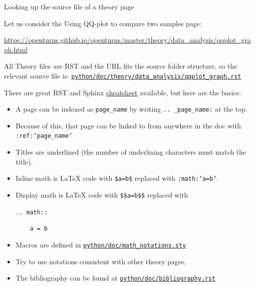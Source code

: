 \documentclass[8pt]{beamer}
\begin{document}
\begin{frame}{Looking up the source file of a theory page}


Let us consider the \alert{Using QQ-plot to compare two samples} page:

\url{https://openturns.github.io/openturns/master/theory/data_analysis/qqplot_graph.html}

All Theory files are RST and the URL fits the source folder structure, so the relevant source file is:
\href{https://github.com/openturns/openturns/blob/master/python/doc/theory/data_analysis/qqplot_graph.rst}{\texttt{python/doc/theory/data\_analysis/qqplot\_graph.rst}}

There are great RST and Sphinx \href{https://thomas-cokelaer.info/tutorials/sphinx/rest_syntax.html}{\alert{cheatsheet}} available,
but here are the basics:

\begin{itemize}
    \item A page can be \alert{indexed} as \texttt{page\_name} by writing \texttt{.. \_page\_name:} at the top.
    \item Because of this, that page can be \alert{linked} to from anywhere in the doc with \texttt{:ref:`page\_name`}
    \item \alert{Titles} are underlined (the number of underlining characters must match the title).
    \item \alert{Inline math} is \LaTeX{} code with \texttt{\$a=b\$} replaced with \texttt{:math:`a=b`}.
    \item \alert{Display math} is \LaTeX{} code with \texttt{\$\$a=b\$\$} replaced with
    
    \texttt{.. math::}
    
    \texttt{~~~~a = b}
    \item \alert{Macros} are defined in \href{https://github.com/openturns/openturns/blob/master/python/doc/math_notations.sty}{\texttt{python/doc/math\_notations.sty}}
    \item Try to use notations \alert{consistent} with other theory pages.
    \item The \alert{bibliography} can be found at \href{https://github.com/openturns/openturns/blob/master/python/doc/bibliography.rst}{\texttt{python/doc/bibliography.rst}}
\end{itemize}

\end{frame}
\end{document}
